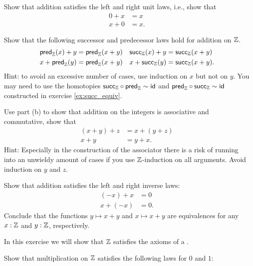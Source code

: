 \begin{exercises}
\begin{subexenum}
  \item Show that addition satisfies the left and right unit laws, i.e., show that
    \begin{align*}
      0+x & = x \\
      x+0 & = x.
    \end{align*}
  \item Show that the following successor and predecessor laws hold for addition on ${\mathbb{Z}}$.
    \begin{align*}
      \mathsf{pred}_{{\mathbb{Z}}}(x)+y & = \mathsf{pred}_{{\mathbb{Z}}}(x+y) & \mathsf{succ}_{{\mathbb{Z}}}(x)+y & = \mathsf{succ}_{{\mathbb{Z}}}(x+y) \\
      x+\mathsf{pred}_{{\mathbb{Z}}}(y) & = \mathsf{pred}_{{\mathbb{Z}}}(x+y) & x+\mathsf{succ}_{{\mathbb{Z}}}(y) & = \mathsf{succ}_{{\mathbb{Z}}}(x+y).
    \end{align*}
    Hint: to avoid an excessive number of cases, use induction on $x$ but not on $y$. You may need to use the homotopies $\mathsf{succ}_{{\mathbb{Z}}}\circ \mathsf{pred}_{{\mathbb{Z}}}\sim \mathsf{id}_{}$ and $\mathsf{pred}_{{\mathbb{Z}}}\circ\mathsf{succ}_{{\mathbb{Z}}}\sim\mathsf{id}_{}$ constructed in exercise \cref{ex:succ_equiv}.
  \item Use part (b) to show that addition on the integers is associative and commutative, show that
    \begin{align*}
      (x+y)+z & = x + (y+z) \\
      x+y & = y+x.
    \end{align*}
    Hint: Especially in the construction of the associator there is a risk of running into an unwieldy amount of cases if you use ${\mathbb{Z}}$-induction on all arguments. Avoid induction on $y$ and $z$.
  \item Show that addition satisfies the left and right inverse laws:
    \begin{align*}
      (-x)+x & =0 \\
      x+(-x) &=0.
    \end{align*}
    Conclude that the functions $y \mapsto x + y$ and $x\mapsto x + y$ are equivalences for any $x:{\mathbb{Z}}$ and $y:{\mathbb{Z}}$, respectively.
  \end{subexenum}
  \exercise \label{ex:ring-Z}In this exercise we will show that ${\mathbb{Z}}$ satisfies the axioms of a .
  \begin{subexenum}
  \item Show that multiplication on ${\mathbb{Z}}$ satisfies the following laws for $0$ and $1$:

\end{subexenum}
\end{exercises}
